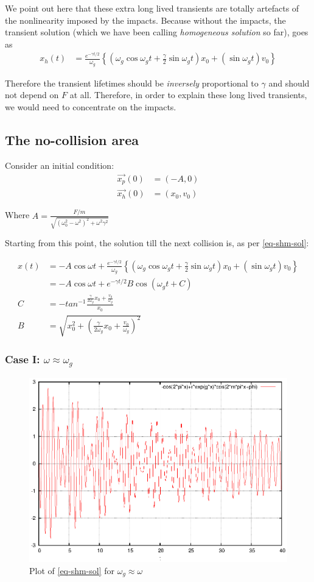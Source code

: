 \documentclass{book}
\renewcommand{\(}{\begin{columns}}
\renewcommand{\)}{\end{columns}}
\newcommand{\<}[1]{\begin{column}{#1}}
\renewcommand{\>}{\end{column}}
\begin{document}
We point out here that these extra long lived transients are totally artefacts 
of the nonlinearity imposed by the impacts.  Because without the impacts, the 
transient solution (which we have been calling \emph{homogeneous solution} so 
far), goes as 
\begin{align}
x_h(t)&=\frac{e^{-\gamma t/2}}{\omega_g}\left\{(\omega_g\cos{\omega_gt}+\frac{\gamma}{2}\sin{\omega_gt})x_0 + (\sin{\omega_gt})v_0 \right\}
\end{align}

Therefore the transient lifetimes should be \emph{inversely} proportional to 
$\gamma$ and should not depend on $F$ at all.  Therefore, in order to explain 
these long lived transients, we would need to concentrate on the impacts.  

\subsection{The no-collision area}
Consider an initial condition:
\begin{align*}
\vec{x_p}(0)&=(-A,0)\\
\vec{x_h}(0)&=(x_0,v_0)
\end{align*}

Where $A=\frac{F/m}{\sqrt{(\omega_0^2-\omega^2)^2+\omega^2\gamma^2}}$

Starting from this point, the solution till the next collision is, as per \eqref{eq-shm-sol}:

\begin{align*}
x(t)&=-A\cos{\omega t}+\frac{e^{-\gamma t/2}}{\omega_g}\left\{(\omega_g\cos{\omega_gt}+\frac{\gamma}{2}\sin{\omega_gt})x_0 + (\sin{\omega_gt})v_0 \right\}\\
&=-A\cos{\omega t}+e^{-\gamma t/2}B\cos{\left(\omega_g t+C\right)}\\
C&=-tan^{-1}\frac{\frac{\gamma}{2\omega_g}x_0+\frac{v_0}{\omega_g}}{x_0}\\
B&=\sqrt{x_0^2+\left(\frac{\gamma}{2\omega_g}x_0+\frac{v_0}{\omega_g}\right)^2}
\end{align*}

\subsubsection{Case I: $\omega\approx\omega_g$}
\begin{figure}[!htb]
\begin{center}
\caption{Plot of \eqref{eq-shm-sol} for $\omega_g\approx\omega$}
\label{fig-shm-plot}
\includegraphics[width=0.6\columnwidth]{beats-decaying}
\end{center}
\end{figure}
\end{document}
